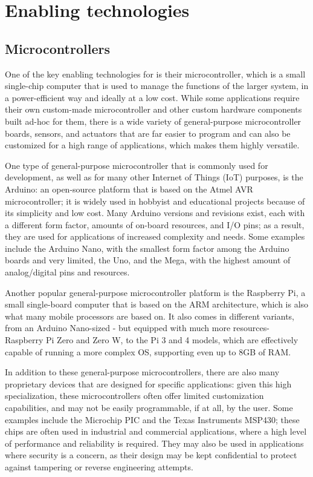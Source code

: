 \section{Enabling technologies}
\subsection{Microcontrollers}
One of the key enabling technologies for \ess is their microcontroller, which is a small single-chip computer that is used to manage the functions of the larger system, in a power-efficient way and ideally at a low cost. While some applications require their own custom-made microcontroller and other custom hardware components built ad-hoc for them, there is a wide variety of general-purpose microcontroller boards, sensors, and actuators that are far easier to program and can also be customized for a high range of applications, which makes them highly versatile.

One type of general-purpose microcontroller that is commonly used for \ess development, as well as for many other Internet of Things (IoT) purposes, is the Arduino: an open-source platform that is based on the Atmel AVR microcontroller; it is widely used in hobbyist and educational projects because of its simplicity and low cost. Many Arduino versions and revisions exist, each with a different form factor, amounts of on-board resources, and I/O pins; as a result, they are used for applications of increased complexity and needs. Some examples include the Arduino Nano, with the smallest form factor among the Arduino boards and very limited, the Uno, and the Mega, with the highest amount of analog/digital pins and resources.

Another popular general-purpose microcontroller platform is the Raspberry Pi, a small single-board computer that is based on the ARM architecture, which is also what many mobile processors are based on. It also comes in different variants, from an Arduino Nano-sized - but equipped with much more resources- Raspberry Pi Zero and Zero W, to the Pi 3 and 4 models, which are effectively capable of running a more complex OS, supporting even up to 8GB of RAM.

In addition to these general-purpose microcontrollers, there are also many proprietary devices that are designed for specific applications: given this high specialization, these microcontrollers often offer limited customization capabilities, and may not be easily programmable, if at all, by the user. Some examples include the Microchip PIC and the Texas Instruments MSP430; these chips are often used in industrial and commercial applications, where a high level of performance and reliability is required. They may also be used in applications where security is a concern, as their design may be kept confidential to protect against tampering or reverse engineering attempts.

